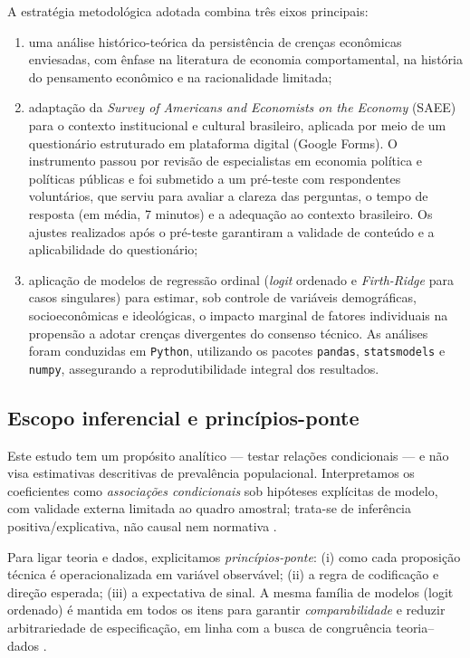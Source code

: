 A estratégia metodológica adotada combina três eixos principais:
\begin{enumerate}[label=\alph*)]
    \item uma análise histórico-teórica da persistência de crenças econômicas enviesadas, com ênfase na literatura de economia comportamental, na história do pensamento econômico e na racionalidade limitada;
    \item adaptação da \textit{Survey of Americans and Economists on the Economy} (SAEE) para o contexto institucional e cultural brasileiro, aplicada por meio de um questionário estruturado em plataforma digital (Google Forms). O instrumento passou por revisão de especialistas em economia política e políticas públicas e foi submetido a um pré-teste com respondentes voluntários, que serviu para avaliar a clareza das perguntas, o tempo de resposta (em média, 7 minutos) e a adequação ao contexto brasileiro. Os ajustes realizados após o pré-teste garantiram a validade de conteúdo e a aplicabilidade do questionário;
    \item aplicação de modelos de regressão ordinal (\textit{logit} ordenado e \textit{Firth-Ridge} para casos singulares) para estimar, sob controle de variáveis demográficas, socioeconômicas e ideológicas, o impacto marginal de fatores individuais na propensão a adotar crenças divergentes do consenso técnico. As análises foram conduzidas em \texttt{Python}, utilizando os pacotes \texttt{pandas}, \texttt{statsmodels} e \texttt{numpy}, assegurando a reprodutibilidade integral dos resultados.
\end{enumerate}

\subsection{Escopo inferencial e princípios-ponte}\label{sec:escopo-inferencial}

Este estudo tem um propósito analítico — testar relações condicionais — e não visa estimativas descritivas de prevalência populacional. Interpretamos os coeficientes como \textit{associações condicionais} sob hipóteses explícitas de modelo, com validade externa limitada ao quadro amostral; trata-se de inferência positiva/explicativa, não causal nem normativa \cite{hausman2008}.

Para ligar teoria e dados, explicitamos \textit{princípios-ponte}: (i) como cada proposição técnica é operacionalizada em variável observável; (ii) a regra de codificação e direção esperada; (iii) a expectativa de sinal. A mesma família de modelos (logit ordenado) é mantida em todos os itens para garantir \textit{comparabilidade} e reduzir arbitrariedade de especificação, em linha com a busca de congruência teoria--dados \cite{stigum2003}.


